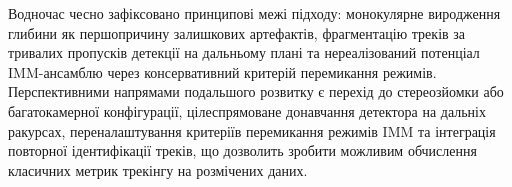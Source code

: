 \begin{unnumbered}
Водночас чесно зафіксовано принципові межі підходу: монокулярне виродження глибини як
першопричину залишкових артефактів, фрагментацію треків за тривалих пропусків детекції
на дальньому плані та нереалізований потенціал \gls{IMM}-ансамблю через консервативний
критерій перемикання режимів. Перспективними напрямами подальшого розвитку є перехід до
стереозйомки або багатокамерної конфігурації, цілеспрямоване донавчання детектора на
дальніх ракурсах, переналаштування критеріїв перемикання режимів \gls{IMM} та інтеграція
повторної ідентифікації треків, що дозволить зробити можливим обчислення класичних метрик
трекінгу на розмічених даних.

\end{unnumbered}
